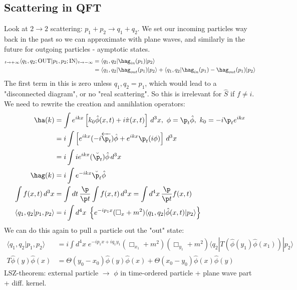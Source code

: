 \documentclass[a4paper, 11pt, normalem]{report}
\newcommand\hphi{\hat{\phi}}
\newcommand\hpi{\hat{\pi}}
\begin{document}
\section{Scattering in QFT}
Look at $2\to2$ scattering: $p_1 + p_2 \to q_1 + q_2$.
We set our incoming particles way back in the past so we can approximate with plane waves, and similarly in the future for outgoing particles - aymptotic states.
\begin{align}
    {}_{t\to +\infty}\langle q_1,q_2;\text{OUT}|p_1,p_2;\text{IN}\rangle_{t\to-\infty} &= \langle q_1,q_2|\hag_{in}(p_1)|p_2\rangle \\
                                                                                       &= \langle q_1,q_2|\hag_{out}(p_1)|p_2\rangle + \langle q_1,q_2|\hag_{in}(p_1)-\hag_{out}(p_1)|p_2\rangle
\end{align}
The first term in this is zero unless $q_1,q_2=p_1$, which would lead to a "disconnected diagram", or no "real scattering".
So this is irrelevant for $\hat{S}$ if $f \neq i$.
We need to rewrite the creation and annihlation operators:
\begin{align}
    \ha(k) &= \int e^{ikx}\left[k_0\hphi(x,t) + i\hpi(x,t)\right]\,d^3x,~ \phi = \p_t\hphi,~ k_0 = -i\p_te^{ikx} \\
           &= i\int \left[e^{ikx}(-i\overleftarrow{\p_t})\hphi+e^{ikx}\p_t(i\phi)\right]\,d^3x \\
           &= i\int ie^{ikx}(\breve{\p_t})\hphi\,d^3x \\
    \hag(k) &= i\int e^{-ikx}\breve{\p_t}\hphi \\
    \int f(x,t)\,d^3x &= \int dt\,\frac{\p}{\p t}\int f(x,t)\,d^3x = \int d^4x\,\frac{\p}{\p t}f(x,t) \\
    \langle q_1,q_2|p_1,p_2\rangle &= i\int d^4x\;\left\{e^{-ip_1x}(\Box_x+m^2)\langle q_1,q_2|\hphi(x,t)|p_2\rangle\right\}
\end{align}
We can do this again to pull a particle out the "out" state:
\begin{align}
    \langle q_1,q_2|p_1,p_2\rangle &= i\int d^4x\; e^{-ip_1x+iq_1y_1}(\Box_{x_1}+m^2)(\Box_{y_1}+m^2)\langle q_2|T(\hphi(y_1)\hphi(x_1))|p_2\rangle \\
    T\hphi(y)\hphi(x) &= \Theta(y_0-x_0)\hphi(y)\hphi(x) + \Theta(x_0-y_0)\hphi(x)\hphi(y)
\end{align}
LSZ-theorem: external particle $\to$ $\phi$ in time-ordered particle + plane wave part + diff. kernel.

\chapter{}
\end{document}
